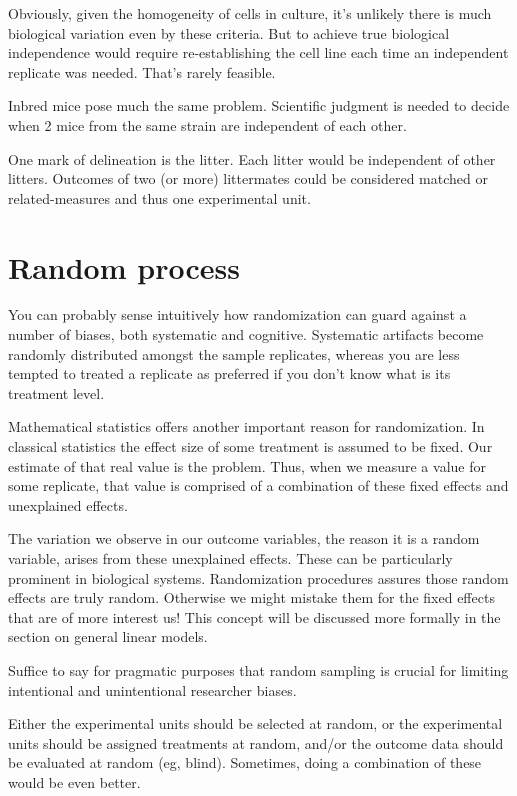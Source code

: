 \documentclass[]{book}
\begin{document}
Obviously, given the homogeneity of cells in culture, it's unlikely there is much biological variation even by these criteria. But to achieve true biological independence would require re-establishing the cell line each time an independent replicate was needed. That's rarely feasible.

Inbred mice pose much the same problem. Scientific judgment is needed to decide when 2 mice from the same strain are independent of each other.

One mark of delineation is the litter. Each litter would be independent of other litters. Outcomes of two (or more) littermates could be considered matched or related-measures and thus one experimental unit.

\hypertarget{random-process}{%
\section{Random process}\label{random-process}}

You can probably sense intuitively how randomization can guard against a number of biases, both systematic and cognitive. Systematic artifacts become randomly distributed amongst the sample replicates, whereas you are less tempted to treated a replicate as preferred if you don't know what is its treatment level.

Mathematical statistics offers another important reason for randomization. In classical statistics the effect size of some treatment is assumed to be fixed. Our estimate of that real value is the problem. Thus, when we measure a value for some replicate, that value is comprised of a combination of these fixed effects and unexplained effects.

The variation we observe in our outcome variables, the reason it is a random variable, arises from these unexplained effects. These can be particularly prominent in biological systems. Randomization procedures assures those random effects are truly random. Otherwise we might mistake them for the fixed effects that are of more interest us! This concept will be discussed more formally in the section on general linear models.

Suffice to say for pragmatic purposes that random sampling is crucial for limiting intentional and unintentional researcher biases.

Either the experimental units should be selected at random, or the experimental units should be assigned treatments at random, and/or the outcome data should be evaluated at random (eg, blind). Sometimes, doing a combination of these would be even better.
\end{document}
